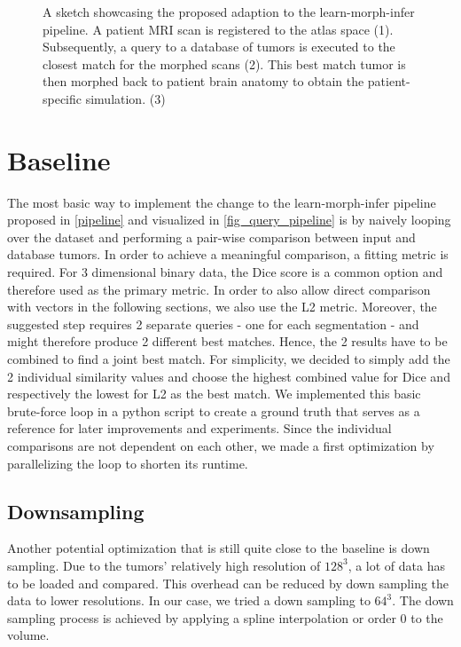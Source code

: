 \begin{figure}[htbp]
  \centering
  
  \caption{A sketch showcasing the proposed adaption to the learn-morph-infer pipeline. A patient MRI scan is registered to the atlas space (1). Subsequently, a query to a database of tumors is executed to the closest match for the morphed scans (2). This best match tumor is then morphed back to patient brain anatomy to obtain the patient-specific simulation. (3)}\label{fig_query_pipeline}
\end{figure}

\FloatBarrier
\section{Baseline}
The most basic way to implement the change to the learn-morph-infer pipeline proposed in \autoref{pipeline} and visualized in \autoref{fig_query_pipeline} is by naively looping over the dataset and performing a pair-wise comparison between input and database tumors. In order to achieve a meaningful comparison, a fitting metric is required.
For 3 dimensional binary data, the Dice score is a common option  and therefore used as the primary metric. In order to also allow direct comparison with vectors in the following sections, we also use the L2 metric.
Moreover, the suggested step requires 2 separate queries - one for each segmentation - and might therefore produce 2 different best matches. Hence, the 2 results have to be combined to find a joint best match. For simplicity, we decided to simply add the 2 individual similarity values and choose the highest combined value for Dice and respectively the lowest for L2 as the best match. 
We implemented this basic brute-force loop in a python script to create a ground truth that serves as a reference for later improvements and experiments.
Since the individual comparisons are not dependent on each other, we made a first optimization by parallelizing the loop to shorten its runtime.

\subsection{Downsampling}
Another potential optimization that is still quite close to the baseline is down sampling. Due to the tumors' relatively high resolution of $128^3$, a lot of data has to be loaded and compared. This overhead can be reduced by down sampling the data to lower resolutions. In our case, we tried a down sampling to $64^3$.  The down sampling process is achieved by applying a spline interpolation or order 0 to the volume. 


